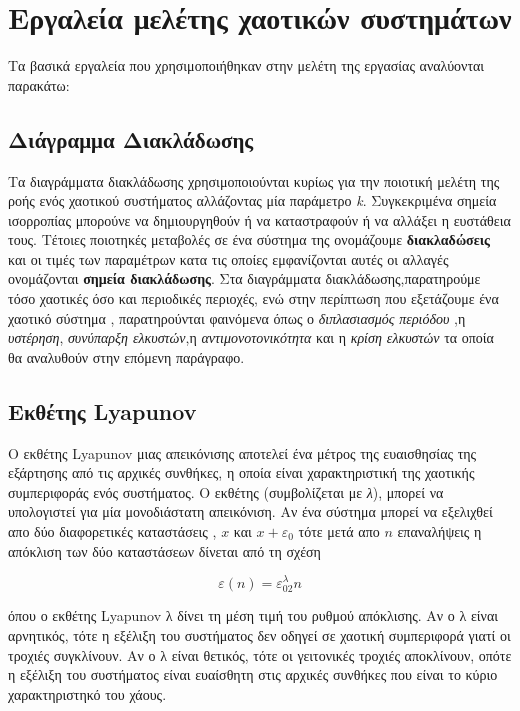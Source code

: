  
\section{Εργαλεία μελέτης χαοτικών συστημάτων}
Τα βασικά εργαλεία που χρησιμοποιήθηκαν στην μελέτη της εργασίας αναλύονται παρακάτω:

\subsection{Διάγραμμα Διακλάδωσης}

Tα διαγράμματα διακλάδωσης χρησιμοποιούνται κυρίως για την ποιοτική μελέτη της ροής ενός χαοτικού συστήματος αλλάζοντας μία παράμετρο \emph{k}. Συγκεκριμένα σημεία ισορροπίας μπορούνε να δημιουργηθούν ή να καταστραφούν ή να αλλάξει η ευστάθεια τους. Τέτοιες ποιοτηκές μεταβολές σε ένα σύστημα της ονομάζουμε \textbf{διακλαδώσεις} και οι τιμές των παραμέτρων κατα τις οποίες εμφανίζονται αυτές οι αλλαγές ονομάζονται \textbf{σημεία διακλάδωσης}. Στα διαγράμματα διακλάδωσης,παρατηρούμε τόσο χαοτικές όσο και περιοδικές περιοχές, ενώ στην περίπτωση που εξετάζουμε ένα χαοτικό σύστημα , παρατηρούνται φαινόμενα όπως ο \emph{διπλασιασμός περιόδου} ,η \emph{υστέρηση}, \emph{συνύπαρξη ελκυστών},η \emph{αντιμονοτονικότητα} και η \emph{κρίση ελκυστών} τα οποία θα αναλυθούν στην επόμενη παράγραφο.\cite{b4}

\subsection{Εκθέτης Lyapunov}
Ο εκθέτης Lyapunov μιας απεικόνισης αποτελεί ένα μέτρος της ευαισθησίας της εξάρτησης από τις αρχικές συνθήκες, η οποία είναι χαρακτηριστική της χαοτικής συμπεριφοράς ενός συστήματος. Ο εκθέτης (συμβολίζεται με \emph{λ}), μπορεί να υπολογιστεί για μία μονοδιάστατη απεικόνιση. Αν ένα σύστημα μπορεί να εξελιχθεί απο δύο διαφορετικές καταστάσεις , $x$ και $ x + ε_0$ τότε μετά απο $n$ επαναλήψεις η απόκλιση των δύο καταστάσεων δίνεται από τη σχέση

\begin{equation}
	ε(n) = ε_02^λn
\end{equation}

όπου ο εκθέτης Lyapunov λ δίνει τη μέση τιμή του ρυθμού απόκλισης. Αν ο λ είναι αρνητικός, τότε η εξέλιξη του συστήματος δεν οδηγεί σε χαοτική συμπεριφορά γιατί οι τροχιές συγκλίνουν. Αν ο λ είναι θετικός, τότε οι γειτονικές τροχιές αποκλίνουν, οπότε η εξέλιξη του συστήματος είναι ευαίσθητη στις αρχικές συνθήκες που είναι το κύριο χαρακτηριστηκό του χάους.\cite{b5}
\clearpage

